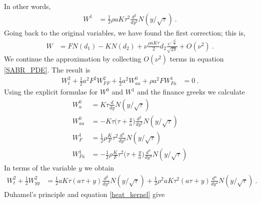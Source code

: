 \documentclass[10pt]{article}
\numberwithin{equation}{section}
\begin{document}
In other words,
\begin{equation*}
	\begin{split}
	W^{1}&=\frac{1}{2}\rho a K \tau^2 \frac{d^2}{dy^2}N(y/\sqrt{\tau})\:.
	\end{split}
\end{equation*}
Going back to the original variables, we have found the first correction; this is,
\begin{equation*}
	\begin{split}
	W&=FN(d_1)-KN(d_2)+\nu \frac{\rho a K \tau }{2} d_2 \frac{e^{-\frac{d_2^2}{2}} }{\sqrt{2\pi}} +O(\nu^2)\:.
	\end{split}
\end{equation*}
We continue the approximation by collecting $O(\nu^2)$ terms in equation \eqref{SABR_PDE}. The result is
\begin{equation*}
	\begin{split}
	W^{2}_{t} +\frac{1}{2} a^2 F^2 W^{2}_{FF}+\frac{1}{2} a^2 W^{0}_{aa}+\rho a^2 F W^{1}_{Fa}&=0\:.
	\end{split}
\end{equation*}
Using the explicit formulae for $W^{0}$ and $W^{1}$ and the finance greeks we calculate
\begin{equation*}
	\begin{split}
	  W_{a}^{0} &= K\tau \frac{d}{dy} N(y/\sqrt{\tau})\\
	  W_{aa}^{0} &=- K\tau\biggl( \tau + \frac{y}{a}\biggr) \frac{d^2}{d y^2} N(y/\sqrt{\tau})\\
	  W_{F}^{1} &= \frac{1}{2}\rho \frac{K}{F} \tau^2 \frac{d^3}{dy^3}N(y/\sqrt{\tau})\\
	    W_{Fa}^{1} &= -\frac{1}{2}\rho \frac{K}{F} \tau^2 \biggl(\tau+\frac{y}{a}\biggr) \frac{d^4}{dy^4}N(y/\sqrt{\tau})
	\end{split}
\end{equation*}
In terms of the variable $y$ we obtain
\begin{equation*}
	\begin{split}
	W^{2}_{t} +\frac{1}{2} W^{2}_{yy} &= \frac{1}{2}aK\tau ( a\tau + y ) \frac{d^2}{d y^2} N(y/\sqrt{\tau}) + \frac{1}{2}\rho^2 a K \tau^2 (a\tau+y ) \frac{d^4}{dy^4}N(y/\sqrt{\tau})\:.
	\end{split}
\end{equation*}
Duhamel's principle and equation \eqref{heat_kernel} give
\end{document}
